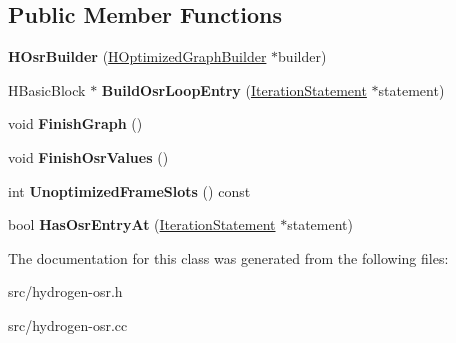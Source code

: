 \subsection*{Public Member Functions}
\begin{DoxyCompactItemize}
\item 
\hypertarget{classv8_1_1internal_1_1_h_osr_builder_a50e93a01f42e02a6159e136b84476a9a}{}{\bfseries H\+Osr\+Builder} (\hyperlink{classv8_1_1internal_1_1_h_optimized_graph_builder}{H\+Optimized\+Graph\+Builder} $\ast$builder)\label{classv8_1_1internal_1_1_h_osr_builder_a50e93a01f42e02a6159e136b84476a9a}

\item 
\hypertarget{classv8_1_1internal_1_1_h_osr_builder_a162b1e038169ddc7da40528b1abf5e1a}{}H\+Basic\+Block $\ast$ {\bfseries Build\+Osr\+Loop\+Entry} (\hyperlink{classv8_1_1internal_1_1_iteration_statement}{Iteration\+Statement} $\ast$statement)\label{classv8_1_1internal_1_1_h_osr_builder_a162b1e038169ddc7da40528b1abf5e1a}

\item 
\hypertarget{classv8_1_1internal_1_1_h_osr_builder_a92e40fe3bf62dba381dbb1f824ebfb52}{}void {\bfseries Finish\+Graph} ()\label{classv8_1_1internal_1_1_h_osr_builder_a92e40fe3bf62dba381dbb1f824ebfb52}

\item 
\hypertarget{classv8_1_1internal_1_1_h_osr_builder_ab01514c8ab05f66167bbf9c8687eb14e}{}void {\bfseries Finish\+Osr\+Values} ()\label{classv8_1_1internal_1_1_h_osr_builder_ab01514c8ab05f66167bbf9c8687eb14e}

\item 
\hypertarget{classv8_1_1internal_1_1_h_osr_builder_af42314c459a1aecb58654d0bbafe163f}{}int {\bfseries Unoptimized\+Frame\+Slots} () const \label{classv8_1_1internal_1_1_h_osr_builder_af42314c459a1aecb58654d0bbafe163f}

\item 
\hypertarget{classv8_1_1internal_1_1_h_osr_builder_aee612515fffa7cee1dc131f66a6fe6db}{}bool {\bfseries Has\+Osr\+Entry\+At} (\hyperlink{classv8_1_1internal_1_1_iteration_statement}{Iteration\+Statement} $\ast$statement)\label{classv8_1_1internal_1_1_h_osr_builder_aee612515fffa7cee1dc131f66a6fe6db}

\end{DoxyCompactItemize}


The documentation for this class was generated from the following files\+:\begin{DoxyCompactItemize}
\item 
src/hydrogen-\/osr.\+h\item 
src/hydrogen-\/osr.\+cc\end{DoxyCompactItemize}
